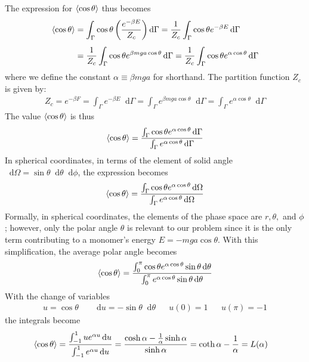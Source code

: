 \documentclass[11pt, a4paper]{article}
\newcommand*\diff{\mathop{}\!\mathrm{d}} %
\begin{document}
The expression for $  \expval{\cos \theta } $ thus becomes
\begin{align*}
	\expval{\cos \theta } &= \int_{\Gamma} \cos \theta \left(\frac{e^{-\beta E}}{Z_c}\right) \diff \Gamma = \frac{1}{Z_c} \int_{\Gamma} \cos \theta e^{-\beta E} \diff \Gamma \\[1.0ex]
	& =  \frac{1}{Z_c} \int_{\Gamma} \cos \theta e^{\beta mga \cos \theta} \diff \Gamma = \frac{1}{Z_c} \int_{\Gamma} \cos \theta e^{\alpha \cos \theta} \diff \Gamma 
\end{align*}
where we define the constant $ \alpha \equiv \beta m g a $ for shorthand.  The partition function $ Z_c $ is given by:
\begin{align*}
	Z_c = e^{-\beta F} = \int_\Gamma e^{-\beta E} \diff \Gamma = \int_\Gamma e^{ \beta m g a \cos \theta} \diff \Gamma = \int_{\Gamma} e^{\alpha \cos \theta} \diff \Gamma
\end{align*}
The value  $  \expval{\cos \theta } $  is thus
\begin{align*}
	\expval{\cos \theta }  = \frac{\int_{\Gamma} \cos \theta e^{\alpha \cos \theta} \diff \Gamma }{\int_{\Gamma} e^{\alpha \cos \theta} \diff \Gamma}
\end{align*}
In spherical coordinates, in terms of the element of solid angle $ \diff \Omega = \sin \theta \diff \theta \diff \phi $, the expression becomes
\begin{align*}
	\expval{\cos \theta }  = \frac{\int_{\Gamma} \cos \theta e^{\alpha \cos \theta} \diff \Omega }{\int_{\Gamma} e^{\alpha \cos \theta} \diff \Omega}
\end{align*}
Formally, in spherical coordinates, the elements of the phase space are $ r, \theta, $ and $ \phi $; however, only the polar angle $ \theta $ is relevant to our problem since it is the only term contributing to a monomer's energy $ E = - m g a \cos \theta $. With this simplification, the average polar angle becomes
\begin{align*}
	\expval{\cos \theta }  = \frac{\int_{0}^{\pi} \cos \theta e^{\alpha \cos \theta} \sin \theta \diff \theta }{\int_{0}^{\pi} e^{\alpha \cos \theta} \sin \theta \diff \theta}
\end{align*}
With the change of variables 
\begin{align*}
	u = \cos \theta && \diff u = - \sin \theta \diff \theta && u(0) = 1 && u(\pi) = -1
\end{align*}
the integrals become
\begin{align*}
	\expval{\cos \theta } & = \frac{\int_{-1}^{1} u e^{\alpha u} \diff u }{\int_{-1}^{1} e^{\alpha u} \diff u } = \frac{\cosh \alpha - \frac{1}{\alpha } \sinh \alpha }{\sinh \alpha } = \coth \alpha - \frac{1}{\alpha} = L(\alpha)
\end{align*}
\end{document}
